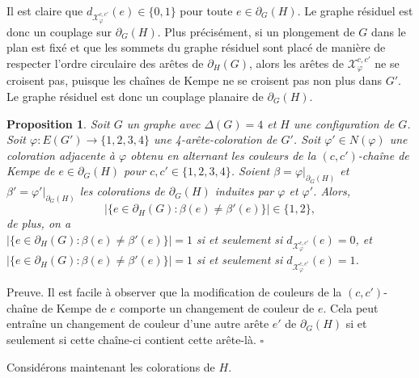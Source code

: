 \documentclass[10pt,a4paper]{article}
\newtheorem{proposition}{Proposition}
\newcommand{\ep}{{\hfill $\square$}}
\begin{document}
Il est claire que $d_{\mathcal{X}_{\varphi}^{c,c'}}(e)\in\{0,1\}$ pour toute $e\in \partial_G(H)$. Le graphe résiduel est donc un couplage sur $\partial_G(H)$. Plus précisément, si un plongement de $G$ dans le plan est fixé et que les sommets du graphe résiduel sont placé de manière de respecter l'ordre circulaire des arêtes de $\partial_H(G)$, alors les arêtes de $\mathcal{X}_{\varphi}^{c,c'}$ ne se croisent pas, puisque les chaînes de Kempe ne se croisent pas non plus dans $G'$. Le graphe résiduel est donc un couplage planaire de $\partial_G(H)$.

\begin{proposition}
Soit $G$ un graphe avec $\Delta(G)=4$ et $H$ une configuration de $G$.
Soit $\varphi:E(G')\to \{1,2,3,4\}$ une 4-arête-coloration de $G'$. 
Soit $\varphi' \in N(\varphi)$ une coloration adjacente à $\varphi$ obtenu en alternant les couleurs de la $(c,c')$-chaîne de Kempe de $e\in \partial_G(H)$ pour $c,c'\in\{1,2,3,4\}$.
Soient $\beta = \varphi|_{\partial_G(H)}$ et $\beta' = \varphi'|_{\partial_G(H)}$ les colorations de  $\partial_G(H)$ induites par $\varphi$ et $\varphi'$. Alors,
$$
|\{e\in \partial_H(G) : \beta(e)\ne \beta'(e)\}| \in \{1,2\},
$$
de plus, on a \\
$|\{e\in \partial_H(G) : \beta(e)\ne \beta'(e)\}|=1$ si et seulement si $d_{\mathcal{X}_{\varphi}^{c,c'}}(e)=0$, et \\
$|\{e\in \partial_H(G) : \beta(e)\ne \beta'(e)\}|=1$ si et seulement si $d_{\mathcal{X}_{\varphi}^{c,c'}}(e)=1$. 
\end{proposition}

Preuve. Il est facile à observer que la modification de couleurs de la $(c,c')$-chaîne de Kempe de $e$ comporte un changement de couleur de $e$. Cela peut entraîne un changement de couleur d'une autre arête $e'$  de $\partial_G(H)$ si et seulement si cette chaîne-ci contient cette arête-là. \ep


Considérons maintenant les colorations de $H$.
\end{document}
